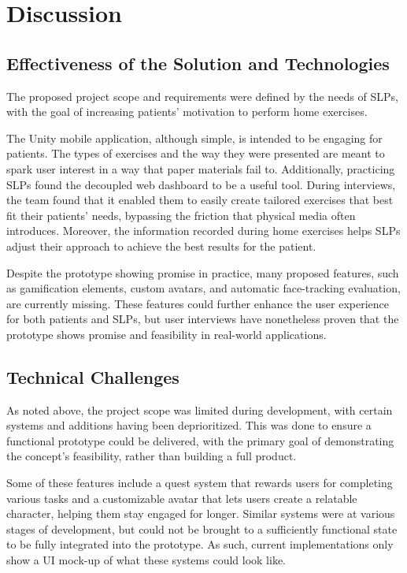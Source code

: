 \chapter{Discussion}
\label{ch:discussion}

\section{Effectiveness of the Solution and Technologies}
\label{sec:effectiveness-of-the-solution-and-technologies}

The proposed project scope and requirements were defined by the needs of SLPs, with the goal of increasing patients' motivation to perform home exercises.

The Unity mobile application, although simple, is intended to be engaging for patients. The types of exercises and the way they were presented are meant to spark user interest in a way that paper materials fail to. Additionally, practicing SLPs found the decoupled web dashboard to be a useful tool. During interviews, the team found that it enabled them to easily create tailored exercises that best fit their patients' needs, bypassing the friction that physical media often introduces. Moreover, the information recorded during home exercises helps SLPs adjust their approach to achieve the best results for the patient.

Despite the prototype showing promise in practice, many proposed features, such as gamification elements, custom avatars, and automatic face-tracking evaluation, are currently missing. These features could further enhance the user experience for both patients and SLPs, but user interviews have nonetheless proven that the prototype shows promise and feasibility in real-world applications.

\section{Technical Challenges}
\label{sec:technical-challenges}

As noted above, the project scope was limited during development, with certain systems and additions having been deprioritized. This was done to ensure a functional prototype could be delivered, with the primary goal of demonstrating the concept's feasibility, rather than building a full product.

Some of these features include a quest system that rewards users for completing various tasks and a customizable avatar that lets users create a relatable character, helping them stay engaged for longer. Similar systems were at various stages of development, but could not be brought to a sufficiently functional state to be fully integrated into the prototype. As such, current implementations only show a UI mock-up of what these systems could look like.


